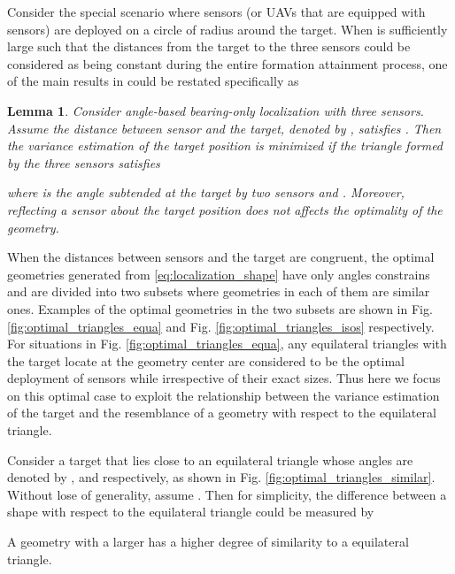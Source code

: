 \documentclass[times]{rncauth}
\newtheorem{lem}{Lemma}[section]
\begin{document}
Consider the special scenario where sensors (or UAVs that are
equipped with sensors) are deployed on a circle of radius  around
the target. When  is sufficiently large such that the distances
from the target to the three sensors could be considered as being
constant during the entire formation attainment process, one of the
main results in \cite{Bishop10sensor} could be restated specifically
as
\begin{lem}
  Consider angle-based bearing-only localization with three sensors. Assume the distance between sensor  and the
  target, denoted by , satisfies .
  Then the variance estimation of the target position is minimized
  if the triangle formed by the three sensors satisfies
  
  where   is the angle subtended at the target by two sensors  and
  . Moreover, reflecting a sensor about the target position does not
affects the optimality of the geometry.
\end{lem}
When  the distances between sensors and the target are congruent,
the optimal geometries generated from \eqref{eq:localization_shape}
have only angles constrains and are divided into two subsets where
geometries in each of them are similar ones. Examples of the optimal
geometries in the two subsets are shown in Fig.
\ref{fig:optimal_triangles_equa} and Fig.
\ref{fig:optimal_triangles_isos} respectively. For situations in
Fig. \ref{fig:optimal_triangles_equa}, any equilateral triangles
with the target locate at the geometry center are considered to be
the optimal deployment of sensors while irrespective of their exact
sizes. Thus here we focus on this optimal case to exploit the
relationship between the variance estimation of the target and the
resemblance of a geometry with respect to the equilateral triangle.

Consider a target that lies close to an equilateral triangle whose
angles are denoted by ,  and
 respectively, as shown in Fig.
\ref{fig:optimal_triangles_similar}. Without lose of generality,
assume . Then for simplicity, the
difference between a shape with respect to the
equilateral triangle could be measured by

A geometry with a larger  has a higher degree of similarity
to a equilateral triangle.
\end{document}
